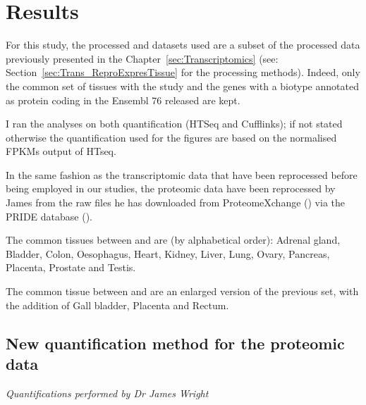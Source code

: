 \section{Results}
\label{sec:IntegrationResults}

For this study, the processed  and  datasets
used are a subset of the processed data previously presented in the
Chapter~\ref{sec:Transcriptomics} (see: Section~\ref{sec:Trans_ReproExpresTissue}
for the processing methods). Indeed, only the common set of tissues with the
 study and the genes with a biotype annotated as protein
coding in the Ensembl 76 released are kept.

I ran the analyses on both quantification (HTSeq and Cufflinks); if not stated
otherwise the quantification used for the figures are based on the normalised
\glspl{FPKM} output of HTseq.


In the same fashion as the transcriptomic data that have been reprocessed before
being employed in our studies, the proteomic data have been reprocessed
by James from the raw files he has downloaded from ProteomeXchange
(\cite{ProteomeXchange:2014}) via the PRIDE database (\cite{Pride:2016}).

The common tissues between  and  are
(by alphabetical order):  Adrenal gland, Bladder, Colon, Oesophagus, Heart,
Kidney, Liver, Lung, Ovary, Pancreas, Placenta, Prostate and Testis.

The common tissue between  and  are
an enlarged version of the previous set, with the addition of Gall bladder,
Placenta and Rectum.

\subsection{New quantification method for the proteomic data}
\label{subsec:IntegrationNewMethQuant}

\textit{Quantifications performed by Dr James Wright}


